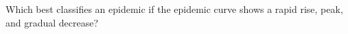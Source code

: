 Which best classifies an epidemic if the epidemic curve shows a rapid rise, peak, and gradual decrease?
\begin{MultipleChoice}[itemname=III-17]
\end{MultipleChoice}
